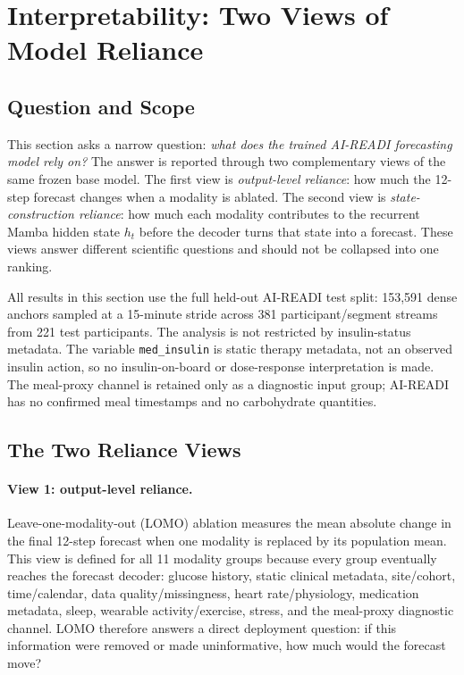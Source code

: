 \section{Interpretability: Two Views of Model Reliance}
\label{sec:interp}

\subsection{Question and Scope}
\label{subsec:interp_scope}

This section asks a narrow question: \emph{what does the trained AI-READI
forecasting model rely on?}
The answer is reported through two complementary views of the same frozen base
model.
The first view is \emph{output-level reliance}: how much the 12-step forecast
changes when a modality is ablated.
The second view is \emph{state-construction reliance}: how much each modality
contributes to the recurrent Mamba hidden state $h_t$ before the decoder turns
that state into a forecast.
These views answer different scientific questions and should not be collapsed
into one ranking.

All results in this section use the full held-out AI-READI test split:
153{,}591 dense anchors sampled at a 15-minute stride across 381
participant/segment streams from 221 test participants.
The analysis is not restricted by insulin-status metadata.
The variable \texttt{med\_insulin} is static therapy metadata, not an observed
insulin action, so no insulin-on-board or dose-response interpretation is made.
The meal-proxy channel is retained only as a diagnostic input group; AI-READI
has no confirmed meal timestamps and no carbohydrate quantities.

\subsection{The Two Reliance Views}
\label{subsec:interp_two_views}

\paragraph{View 1: output-level reliance.}
Leave-one-modality-out (LOMO) ablation measures the mean absolute change in
the final 12-step forecast when one modality is replaced by its population
mean.
This view is defined for all 11 modality groups because every group eventually
reaches the forecast decoder: glucose history, static clinical metadata,
site/cohort, time/calendar, data quality/missingness, heart rate/physiology,
medication metadata, sleep, wearable activity/exercise, stress, and the
meal-proxy diagnostic channel.
LOMO therefore answers a direct deployment question: if this information were
removed or made uninformative, how much would the forecast move?

